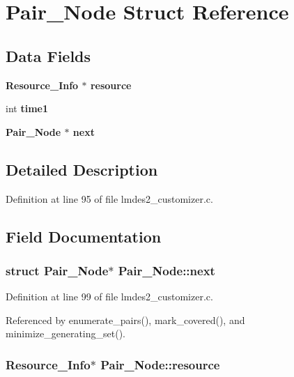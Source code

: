 \section{Pair\_\-Node Struct Reference}
\label{structPair__Node}
\subsection*{Data Fields}
\begin{CompactItemize}
\item 
\bf{Resource\_\-Info} $\ast$ \bf{resource}
\item 
int \bf{time1}
\item 
\bf{Pair\_\-Node} $\ast$ \bf{next}
\end{CompactItemize}


\subsection{Detailed Description}




Definition at line 95 of file lmdes2\_\-customizer.c.

\subsection{Field Documentation}
\subsubsection{\setlength{\rightskip}{0pt plus 5cm}struct \bf{Pair\_\-Node}$\ast$ \bf{Pair\_\-Node::next}}\label{structPair__Node_52a91852dc793620658dc5ff52f569f7}




Definition at line 99 of file lmdes2\_\-customizer.c.

Referenced by enumerate\_\-pairs(), mark\_\-covered(), and minimize\_\-generating\_\-set().
\subsubsection{\setlength{\rightskip}{0pt plus 5cm}\bf{Resource\_\-Info}$\ast$ \bf{Pair\_\-Node::resource}}\label{structPair__Node_9791ae4ee8b004db541141a808b74b95}




